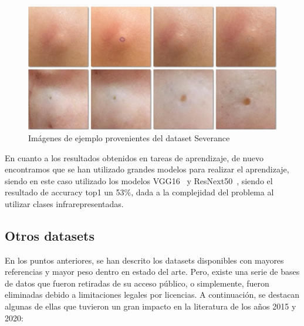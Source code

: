 \begin{figure}[H]
	\centering
	\includegraphics[scale = 0.5]{imagenes/Severance.png}
	\caption{Imágenes de ejemplo provenientes del dataset Severance   }
	 \label{fig:sevimg}
\end{figure}

En cuanto a los resultados obtenidos en tareas de aprendizaje, de nuevo encontramos que se han utilizado grandes modelos para realizar el aprendizaje, siendo en este caso utilizado los modelos VGG16~\cite{simonyan2015deep} y ResNext50~\cite{xie2017aggregated}, siendo el resultado de accuracy top1 un 53\%,  dada a la complejidad del problema al utilizar clases infrarepresentadas.

\subsection{Otros datasets}

En los puntos anteriores, se han descrito los datasets disponibles con mayores referencias y mayor peso dentro en estado del arte. Pero, existe una serie de bases de datos que fueron retiradas de su acceso público, o simplemente, fueron eliminadas debido a limitaciones legales por licencias. A continuación, se destacan algunas de ellas que tuvieron un gran impacto en la literatura de los años 2015 y 2020:

